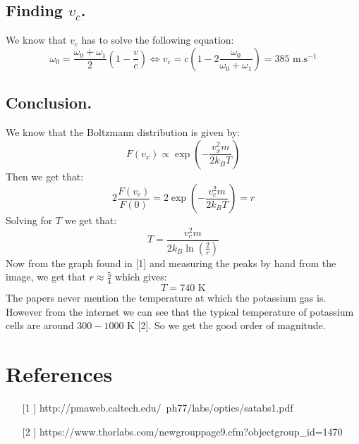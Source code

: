 \documentclass[10pt,a4paper]{article}
\begin{document}
\subsection{Finding $v_c$.}
We know that $v_c$ has to solve the following equation:
\[
\omega_0 = \frac{\omega_0 + \omega_1}{2} \left( 1 - \frac{v}{c}\right) \Leftrightarrow v_c = c\left( 1 - 2\frac{\omega_0}{\omega_0 + \omega_1}\right) = 385 \text{ m.s}^{-1}
\]

\subsection{Conclusion.}
We know that the Boltzmann distribution is given by:
\[
F(v_x) \propto \exp\left( -\frac{v_x^2 m}{2k_B T} \right)
\]
Then we get that:
\[
2\frac{F(v_c)}{F(0)} = 2\exp\left( -\frac{v_c^2 m}{2 k_B T} \right) = r
\]
Solving for $T$ we get that:
\[
T = \frac{v_c^2 m}{2 k_B \ln\left(\frac{2}{r}\right)}
\]
Now from the graph found in [1] and measuring the peaks by hand from the image, we get that $r \approx \frac{5}{4}$ which gives:
\[
T = 740 \text{ K}
\]
The papers never mention the temperature at which the potassium gas is. However from the internet we can see that the typical temperature of potassium cells are around $300-1000$ K [2]. So we get the good order of magnitude.

\section{References}
\begin{enumerate}
\item[[1]] http://pmaweb.caltech.edu/~ph77/labs/optics/satabs1.pdf
\item[[2]] https://www.thorlabs.com/newgrouppage9.cfm?objectgroup\_id=1470
\end{enumerate}
\end{document}
